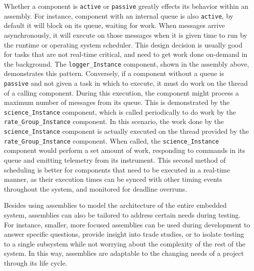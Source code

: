 Whether a component is \texttt{active} or \texttt{passive} greatly effects its behavior within an assembly. For instance, component with an internal queue is also \texttt{active}, by default it will block on its queue, waiting for work. When messages arrive asynchronously, it will execute on those messages when it is given time to run by the runtime or operating system scheduler. This design decision is usually good for tasks that are not real-time critical, and need to get work done on-demand in the background. The \texttt{logger\_Instance} component, shown in the assembly above, demonstrates this pattern. Conversely, if a component without a queue is \texttt{passive} and not given a task in which to execute, it must do work on the thread of a calling component. During this execution, the component might process a maximum number of messages from its queue. This is demonstrated by the \texttt{science\_Instance} component, which is called periodically to do work by the \texttt{rate\_Group\_Instance} component. In this scenario, the work done by the \texttt{science\_Instance} component is actually executed on the thread provided by the \texttt{rate\_Group\_Instance} component. When called, the \texttt{science\_Instance} component would perform a set amount of work, responding to commands in its queue and emitting telemetry from its instrument. This second method of scheduling is better for components that need to be executed in a real-time manner, as their execution times can be synced with other timing events throughout the system, and monitored for deadline overruns. 

Besides using assemblies to model the architecture of the entire embedded system, assemblies can also be tailored to address certain needs during testing. For instance, smaller, more focused assemblies can be used during development to answer specific questions, provide insight into trade studies, or to isolate testing to a single subsystem while not worrying about the complexity of the rest of the system. In this way, assemblies are adaptable to the changing needs of a project through its life cycle.

